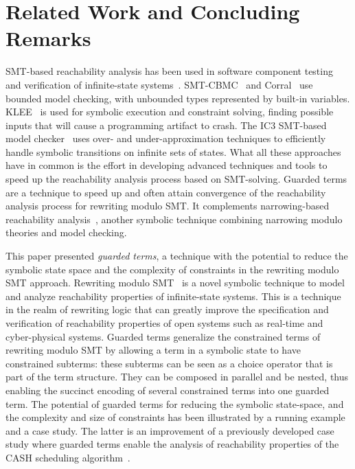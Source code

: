 
\section{Related Work and Concluding Remarks}
\label{sec.concl}

SMT-based reachability analysis has been used in software component
testing and verification of infinite-state
systems~\cite{cadar-seswtesting2013}.
SMT-CBMC~\cite{armando2009bounded} and Corral~\cite{corral} use
bounded model checking, with unbounded types represented by built-in
variables. KLEE~\cite{klee} is used for symbolic execution and
constraint solving, finding possible inputs that will cause a
programming artifact to crash.  The {IC3} SMT-based model
checker~\cite{cimatti-ic32012} uses over- and under-approximation
techniques to efficiently handle symbolic transitions on infinite sets
of states. What all these approaches have in common is the effort in
developing advanced techniques and tools to speed up the reachability
analysis process based on SMT-solving. Guarded terms are a technique
to speed up and often attain convergence of the reachability analysis
process for rewriting modulo SMT.
%
It complements
narrowing-based reachability
analysis~\cite{abstract-lmc-bae,meseguer-narrowing-2007}, another
symbolic technique combining narrowing modulo theories and model
checking.


This paper presented \textit{guarded terms}, a technique with the
potential to reduce the symbolic state space and the complexity of
constraints in the rewriting modulo SMT approach. Rewriting modulo
SMT~\cite{rocha-rewsmtjlamp-2017} is a novel symbolic technique to
model and analyze reachability properties of infinite-state
systems. This is a technique in the realm of rewriting logic that can
greatly improve the specification and verification of reachability
properties of open systems such as real-time and cyber-physical
systems. Guarded terms generalize the constrained terms of rewriting
modulo SMT by allowing a term in a symbolic state to have constrained
subterms: these subterms can be seen as a choice operator that is part
of the term structure. They can be composed in parallel and be nested,
thus enabling the succinct encoding of several constrained terms into
one guarded term.  The potential of guarded terms for reducing the
symbolic state-space, and the complexity and size of constraints has
been illustrated by a running example and a case study. The latter is
an improvement of a previously developed case study where guarded
terms enable the analysis of reachability properties of the CASH
scheduling algorithm~\cite{caccamo2000capacity}.

